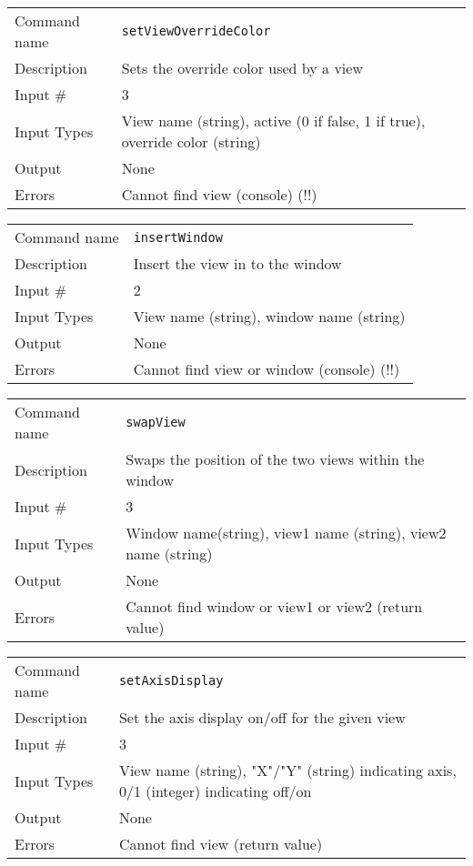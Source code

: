 \bigskip

\noindent
\begin{tabular}{l|p{5in}}
\hline
Command name & {\tt setViewOverrideColor} \\
Description  & Sets the override color used by a view \\
Input \#     & 3 \\
Input Types  & View name (string), active (0 if false, 1 if true),
               override color (string) \\
Output       & None \\
Errors       & Cannot find view (console) (!!) \\
\hline
\end{tabular}

\bigskip

\noindent
\begin{tabular}{l|p{5in}}
\hline
Command name & {\tt insertWindow} \\
Description  & Insert the view in to the window \\
Input \#     & 2 \\
Input Types  & View name (string), window name (string) \\
Output       & None \\
Errors       & Cannot find view or window (console) (!!) \\
\hline
\end{tabular}

\bigskip

\noindent
\begin{tabular}{l|p{5in}}
\hline
Command name & {\tt swapView} \\
Description  & Swaps the position of the two views within the window \\
Input \#     & 3 \\
Input Types  & Window name(string), view1 name (string), view2 name (string) \\
Output       & None \\
Errors       & Cannot find window or view1 or view2 (return value) \\
\hline
\end{tabular}

\bigskip

\noindent
\begin{tabular}{l|p{5in}}
\hline
Command name & {\tt setAxisDisplay} \\
Description  & Set the axis display on/off for the given view \\
Input \#     & 3 \\
Input Types  & View name (string), "X"/"Y" (string) indicating axis,
               0/1 (integer) indicating off/on \\
Output       & None \\
Errors       & Cannot find view (return value) \\
\hline
\end{tabular}

